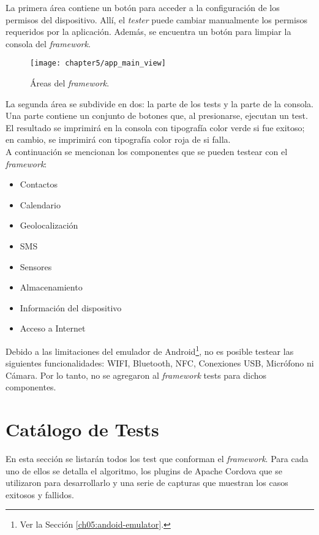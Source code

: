 La primera área contiene un botón para acceder a la configuración de los permisos del dispositivo. Allí, el \textit{tester} puede cambiar manualmente los permisos requeridos por la aplicación. Además, se encuentra un botón para limpiar la consola del \textit{framework}.\\

\begin{figure}[hbtp]
    \centering
	\texttt{[image: chapter5/app\_main\_view]}
	\caption{Áreas del \textit{framework}.}
	\label{fig:chapter05:main_view}
\end{figure}
La segunda área se subdivide en dos: la parte de los tests y la parte de la consola. Una parte contiene un conjunto de botones que, al presionarse, ejecutan un test. El resultado se imprimirá en la consola con tipografía color verde si fue exitoso; en cambio, se imprimirá con tipografía color roja de si falla.\\

A continuación se mencionan los componentes que se pueden testear con el \textit{framework}:
\begin{multicols}{2}
  \begin{itemize}
	\item Contactos
	\item Calendario
	\item Geolocalización
	\item SMS
	\item Sensores
	\item Almacenamiento
	\item Información del dispositivo
	\item Acceso a Internet
  \end{itemize}
\end{multicols}

Debido a las limitaciones del emulador de Android\footnote{Ver la Sección \ref{ch05:andoid-emulator}.}, no es posible testear las siguientes funcionalidades: WIFI, Bluetooth, NFC, Conexiones USB, Micrófono ni Cámara. Por lo tanto, no se agregaron al \textit{framework} tests para dichos componentes.
\section{Catálogo de Tests}
En esta sección se listarán todos los test que conforman el \textit{framework}. Para cada uno de ellos se detalla el algoritmo, los plugins de Apache Cordova que se utilizaron para desarrollarlo y una serie de capturas que muestran los casos exitosos y fallidos.\\

